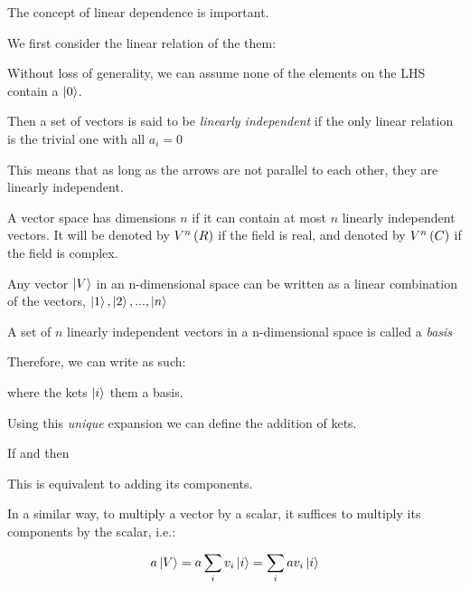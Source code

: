 The concept of linear dependence is important.
\begin{defi}
We first consider the linear relation of the them:

Without loss of generality, we can assume none of the elements on the LHS contain a $\left| 0 \right>$.

Then a set of vectors is said to be \textit{linearly independent} if the only linear relation is the trivial one with all $a_i = 0$ 
\end{defi}

This means that as long as the arrows are not parallel to each other, they are linearly independent.

\begin{defi}[Dimensions]
A vector space has dimensions $n$ if it can contain at most $n$ linearly independent vectors. It will be denoted by $V^n\left(R \right)$ if the field is real, and denoted by $V^n\left(C \right)$ if the field is complex.
\end{defi}

Any vector $\left| V \right>$ in an n-dimensional space can be written as a linear combination of the vectors, $\left| 1 \right>, \left| 2 \right>, ... , \left| n \right>$

\begin{defi}[Basis]
A set of $n$ linearly independent vectors in a n-dimensional space is called a \emph{basis}
\end{defi}

Therefore, we can write as such:

where the kets $\left| i \right>$ them a basis.

Using this \textit{unique} expansion we can define the addition of kets.

\begin{form}
If  and 
then
\end{form}

This is equivalent to adding its components.

In a similar way, to multiply a vector by a scalar, it suffices to multiply its components by the scalar, i.e.:

\begin{form}
$$a\left| V \right> = a \sum_i v_i\left| i \right> = \sum_i av_i\left| i \right>$$
\end{form}

